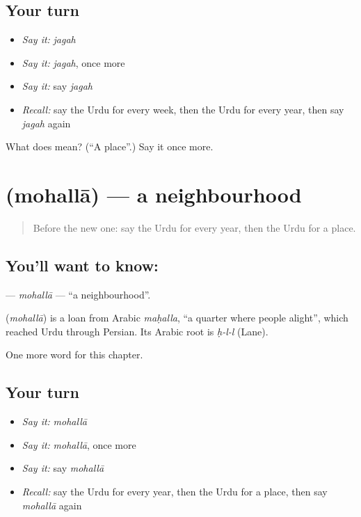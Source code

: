 \subsection*{Your turn}
\begin{itemize}
\raggedright
  \item \emph{Say it:} \emph{jagah}
  \item \emph{Say it:} \emph{jagah}, once more
  \item \emph{Say it:} say \emph{jagah}
  \item \emph{Recall:} say the Urdu for every week, then the Urdu for every year, then say \emph{jagah} again
\end{itemize}

\begin{tcolorbox}[breakable,colback=teal!4,colframe=teal!35!black,title={Before you move on}]
What does  mean? (\textquotedblleft{}A place\textquotedblright{}.) Say it once more.
\end{tcolorbox}
\section[\texorpdfstring{\ur{محلہ} (mohallā)}{محلہ (mohallā)}]{ (mohallā) — a neighbourhood}

\label{lesson:UR-C157-mohalla}



\begin{quote}
Before the new one: say the Urdu for every year, then the Urdu for a place.
\end{quote}

\subsection*{You'll want to know: }
\textbf{} — \emph{mohallā} — \textquotedblleft{}a neighbourhood\textquotedblright{}.

\begin{cousinweb}
\textbf{} (\emph{mohallā}) is a loan from Arabic \emph{maḥalla}, \textquotedblleft{}a quarter where people alight\textquotedblright{}, which reached Urdu through Persian. Its Arabic root is \emph{ḥ-l-l} (Lane).
\end{cousinweb}

\begin{grammarlens}[title={What you've built}]
One more word for this chapter.
\end{grammarlens}

\subsection*{Your turn}
\begin{itemize}
\raggedright
  \item \emph{Say it:} \emph{mohallā}
  \item \emph{Say it:} \emph{mohallā}, once more
  \item \emph{Say it:} say \emph{mohallā}
  \item \emph{Recall:} say the Urdu for every year, then the Urdu for a place, then say \emph{mohallā} again
\end{itemize}

